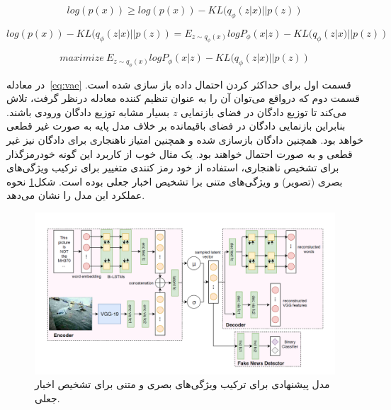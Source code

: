 \documentclass[12pt,a4paper]{report}
\begin{document}
\begin{equation}
log(p(x)) \ge log(p(x)) - KL(q_\phi(z|x) || p(z))
\end{equation}

\begin{equation}
log(p(x)) - KL(q_\phi(z|x) || p(z)) = E_{z \sim q_\phi(x)}logP_\phi(x|z)  -  KL(q_\phi(z|x) || p(z))
\end{equation}


\begin{equation}
maximize\  E_{z \sim q_\phi(x)}logP_\phi(x|z)  -  KL(q_\phi(z|x) || p(z))
\label{eq:vae}
\end{equation}

در معادله~\eqref{eq:vae} قسمت اول برای حداکثر کردن احتمال داده باز سازی شده است. قسمت دوم که درواقع می‌توان آن را به عنوان تنظیم کننده معادله درنظر گرفت، تلاش می‌کند تا توزیع دادگان در فضای بازنمایی $z$ بسیار مشابه توزیع دادگان ورودی باشند. بنابراین بازنمایی دادگان در فضای باقیمانده بر خلاف مدل پایه به صورت غیر قطعی خواهد بود. همچنین دادگان بازسازی شده و همچنین امتیاز ناهنجاری برای دادگان نیز غیر قطعی و به صورت احتمال خواهند بود. یک مثال خوب از کاربرد این گونه خودرمزگذار برای تشخیص ناهنجاری، استفاده از خود رمز کنندی متغییر برای ترکیب ویژگی‌های بصری (تصویر) و ویژگی‌های متنی برا تشخیص اخبار جعلی بوده است\cite{10.1145/3308558.3313552}. شکل\ref{fig:khattar} نحوه عملکرد این مدل را نشان می‌دهد.

\begin{figure}[!h]
	\begin{center}
		\includegraphics[width=1\linewidth]{./images/figures/khattar.png}
	\end{center}
	\caption{مدل پیشنهادی برای ترکیب ویژگی‌های بصری و متنی برای تشخیص اخبار جعلی\cite{10.1145/3308558.3313552}.}
	\label{fig:khattar}
	\centering
\end{figure}
\end{document}
